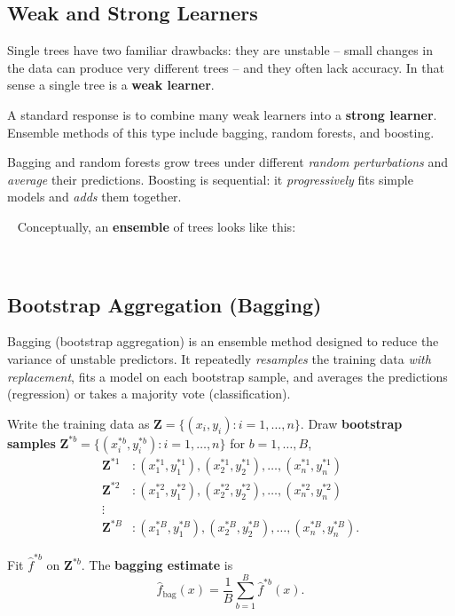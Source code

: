 \documentclass[
]{book}
\begin{document}
\subsection{Weak and Strong Learners}\label{weak-and-strong-learners}

Single trees have two familiar drawbacks: they are unstable -- small changes in the data can produce very different trees -- and they often lack accuracy. In that sense a single tree is a \textbf{weak learner}.

A standard response is to combine many weak learners into a \textbf{strong learner}. Ensemble methods of this type include bagging, random forests, and boosting.

Bagging and random forests grow trees under different \emph{random perturbations} and \emph{average} their predictions. Boosting is sequential: it \emph{progressively} fits simple models and \emph{adds} them together.

~ Conceptually, an \textbf{ensemble} of trees looks like this:
~
~

~~

\subsection{Bootstrap Aggregation (Bagging)}\label{bootstrap-aggregation-bagging}

Bagging (bootstrap aggregation) is an ensemble method designed to reduce the variance of unstable predictors. It repeatedly \emph{resamples} the training data \emph{with replacement}, fits a model on each bootstrap sample, and averages the predictions (regression) or takes a majority vote (classification).

Write the training data as \(\mathbf{Z} = \bigl\{(x_i, y_i): i=1,\ldots,n \bigr\}\). Draw \textbf{bootstrap samples} \(\mathbf{Z}^{*b} = \bigl\{(x_i^{*b}, y_i^{*b}): i=1,\ldots,n \bigr\}\) for \(b=1, \ldots, B\),
\begin{align*}
\mathbf{Z}^{*1} &: (x_1^{*1}, y_1^{*1}), (x_2^{*1}, y_2^{*1}), \ldots, (x_n^{*1}, y_n^{*1})\\
\mathbf{Z}^{*2} &: (x_1^{*2}, y_1^{*2}), (x_2^{*2}, y_2^{*2}), \ldots, (x_n^{*2}, y_n^{*2})\\
\vdots &\\
\mathbf{Z}^{*B}   &: (x_1^{*B}, y_1^{*B}), (x_2^{*B}, y_2^{*B}), \ldots, (x_n^{*B}, y_n^{*B}).
\end{align*}

Fit \(\hat{f}^{*b}\) on \(\mathbf{Z}^{*b}\). The \textbf{bagging estimate} is
\[\hat{f}_{\mathrm{bag}}(x) = \frac{1}{B} \sum_{b=1}^{B} \hat{f}^{*b}(x).\]
\end{document}
